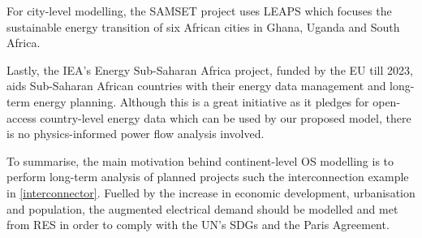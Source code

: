 \documentclass[conference, a4paper]{IEEEtran}
\begin{document}
For city-level modelling, the SAMSET project uses LEAPS which focuses the sustainable energy transition of six African cities in Ghana, Uganda and South Africa.

Lastly,  the IEA's Energy Sub-Saharan Africa project, funded by the EU till 2023, aids Sub-Saharan African countries with their energy data management and long-term energy planning. Although this is a great initiative as it pledges for open-access country-level energy data which can be used by our proposed model, there is no physics-informed power flow analysis involved.

To summarise, the main motivation behind continent-level OS modelling is to perform long-term analysis of planned projects such the interconnection example in \cref{interconnector}. Fuelled by the increase in economic development, urbanisation and population, the augmented electrical demand should be modelled and met from RES in order to comply with the UN's SDGs and the Paris Agreement.
\end{document}
